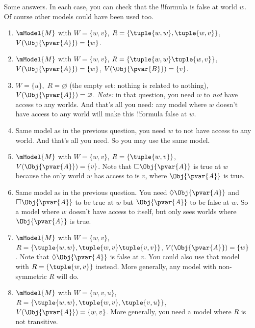 \documentclass[../../../include/open-logic-section]{subfiles}
\begin{document}
\begin{prob}
    \begin{ans}
        Some answers. In each case, you can check that the
        !!{formula} is false at world $w$. Of course other models 
        could have been used too. 
        \begin{enumerate}
            \item $\mModel{M}$ with $W=\{w,v\}$, $R=\{\tuple{w,w},\tuple{w,v}\}$, 
                $V(\Obj{\pvar{A}})=\{w\}$. 
            \item $\mModel{M}$ with $W=\{w,v\}$, $R=\{\tuple{w,w}\tuple{w,v}\}$,
                $V(\Obj{\pvar{A}})=\{w\}$, $V(\Obj{\pvar{B}})=\{v\}$. 
            \item $W=\{u\},$ $R=\varnothing$ (the empty set: nothing is related to
            nothing), $V(\Obj{\pvar{A}})=\varnothing$. \emph{Note:} in that question, 
            you need $w$ to \emph{not} have access to any worlds. And that's 
            all you need: any model where $w$ doesn't have access to any world 
            will make this !!{formula} false at $w$. 
            \item Same model as in the previous question, you need $w$ to not have access
            to any world. And that's all you need. So you may use the same model.
            \item $\mModel{M}$ with $W=\{w,v\}$, $R=\{\tuple{w,v}\}$, 
                $V(\Obj{\pvar{A}})=\{v\}$. Note that $\Box \Obj{\pvar{A}}$ is true at $w$
                because the only world $w$ has access to is $v$, where $\Obj{\pvar{A}}$ 
                is true. 
            \item Same model as in the previous question. You need $\Diamond \Obj{\pvar{A}}$
            and $\Box \Obj{\pvar{A}}$ to be true at $w$ but $\Obj{\pvar{A}}$ to be false at $w$. 
            So a model where $w$ doesn't have access to itself, but only sees
            worlds where $\Obj{\pvar{A}}$ is true. 
            \item $\mModel{M}$ with $W=\{w,v\}$, $R=\{\tuple{w,w},\tuple{w,v}
                \tuple{v,v}\}$, 
                $V(\Obj{\pvar{A}})=\{w\}$. Note that $\Diamond \Obj{\pvar{A}}$ is false at $v$. 
                You could also use that model with $R=\{\tuple{w,v}\}$ instead.
                More generally, any model with non-symmetric $R$ will do.
            \item $\mModel{M}$ with $W=\{w,v,u\}$, $R=\{\tuple{w,w},
                \tuple{w,v},\tuple{v,u}\}$, 
                $V(\Obj{\pvar{A}})=\{w,v\}$. More generally, you need a model where 
                $R$ is not transitive.

\end{enumerate}
\end{ans}
\end{prob}
\end{document}
